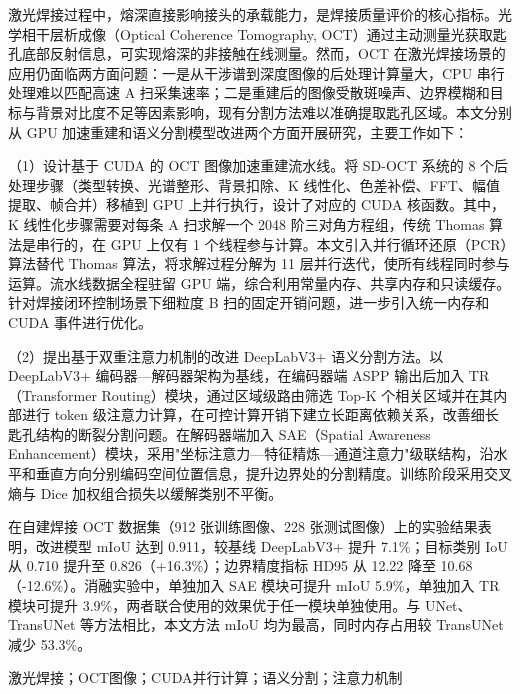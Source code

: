 \begin{abstractCN}
\setlength{\baselineskip}{23pt} %

激光焊接过程中，熔深直接影响接头的承载能力，是焊接质量评价的核心指标。光学相干层析成像（Optical Coherence Tomography, OCT）通过主动测量光获取匙孔底部反射信息，可实现熔深的非接触在线测量。然而，OCT 在激光焊接场景的应用仍面临两方面问题：一是从干涉谱到深度图像的后处理计算量大，CPU 串行处理难以匹配高速 A 扫采集速率；二是重建后的图像受散斑噪声、边界模糊和目标与背景对比度不足等因素影响，现有分割方法难以准确提取匙孔区域。本文分别从 GPU 加速重建和语义分割模型改进两个方面开展研究，主要工作如下：

（1）设计基于 CUDA 的 OCT 图像加速重建流水线。将 SD-OCT 系统的 8 个后处理步骤（类型转换、光谱整形、背景扣除、K 线性化、色差补偿、FFT、幅值提取、帧合并）移植到 GPU 上并行执行，设计了对应的 CUDA 核函数。其中，K 线性化步骤需要对每条 A 扫求解一个 2048 阶三对角方程组，传统 Thomas 算法是串行的，在 GPU 上仅有 1 个线程参与计算。本文引入并行循环还原（PCR）算法替代 Thomas 算法，将求解过程分解为 11 层并行迭代，使所有线程同时参与运算。流水线数据全程驻留 GPU 端，综合利用常量内存、共享内存和只读缓存。针对焊接闭环控制场景下细粒度 B 扫的固定开销问题，进一步引入统一内存和 CUDA 事件进行优化。

（2）提出基于双重注意力机制的改进 DeepLabV3+ 语义分割方法。以 DeepLabV3+ 编码器—解码器架构为基线，在编码器端 ASPP 输出后加入 TR（Transformer Routing）模块，通过区域级路由筛选 Top-K 个相关区域并在其内部进行 token 级注意力计算，在可控计算开销下建立长距离依赖关系，改善细长匙孔结构的断裂分割问题。在解码器端加入 SAE（Spatial Awareness Enhancement）模块，采用"坐标注意力—特征精炼—通道注意力"级联结构，沿水平和垂直方向分别编码空间位置信息，提升边界处的分割精度。训练阶段采用交叉熵与 Dice 加权组合损失以缓解类别不平衡。

在自建焊接 OCT 数据集（912 张训练图像、228 张测试图像）上的实验结果表明，改进模型 mIoU 达到 0.911，较基线 DeepLabV3+ 提升 7.1\%；目标类别 IoU 从 0.710 提升至 0.826（+16.3\%）；边界精度指标 HD95 从 12.22 降至 10.68（-12.6\%）。消融实验中，单独加入 SAE 模块可提升 mIoU 5.9\%，单独加入 TR 模块可提升 3.9\%，两者联合使用的效果优于任一模块单独使用。与 UNet、TransUNet 等方法相比，本文方法 mIoU 均为最高，同时内存占用较 TransUNet 减少 53.3\%。

\end{abstractCN}


\begin{keywordCN}
激光焊接；OCT图像；CUDA并行计算；语义分割；注意力机制
\end{keywordCN}

